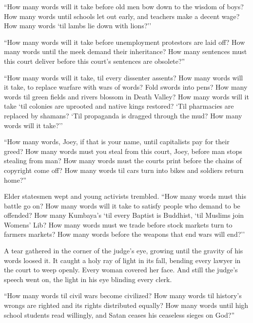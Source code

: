 \documentclass[oneside]{book}
\begin{document}
``How many words will it take before old men bow down to the wisdom
of boys?
How many words until schools let out early, and teachers make a decent wage?
How many words `til lambs lie down with lions?''


``How many words will it take
before unemployment protestors are laid off?
How many words until the meek demand their inheritance?
How many sentences must this court deliver before this court's sentences are obsolete?''

``How many words will it take, til every dissenter assents?  How many words will it take,
to replace warfare with wars of words?  Fold swords into pens?
How many words til green fields and rivers
blossom in Death Valley?
How many words will it take `til
colonies are uprooted and native kings restored?  `Til pharmacies are replaced
by shamans?  `Til propaganda is dragged through the mud?  How many words will it take?''

``How many words, Joey, if that is your name, until capitalists pay for their greed?
How many words must you steal from this court,
Joey, before man stops stealing from man?  How many words must the courts print before
the chains of copyright come off?  How many words til cars turn into bikes
and soldiers return home?''

Elder statesmen wept and young activists trembled.
``How many words must this battle go on?
How many words will it take to satisfy people who demand to be offended?  How many Kumbaya's
`til every Baptist is Buddhist, `til Muslims join Womens' Lib?
How many words must we trade before stock markets turn to farmers
markets?
How many words before the weapons that end wars will end?''

A tear gathered in the corner of the judge's eye, growing until the gravity of
his words loosed it.
It caught a holy ray of light in its fall,
bending every lawyer in the court to weep openly.
Every woman covered her face.
And still the judge's speech went on, the light in his eye blinding every clerk.

``How many words til civil wars become civilized? 
How many words til history's wrongs are righted and its rights distributed equally?
How many words until high school students read willingly, 
and Satan ceases his ceaseless sieges on God?''
\end{document}
